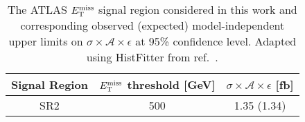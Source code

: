 \begin{table}[!htbp]
  \begin{center}
    \begin{tabular}{c|c|c}
      \hline
      \hline
      Signal Region & $E_{\mathrm{T}}^{\mathrm{miss}}$ threshold [GeV] & $\sigma \times \mathcal{A} \times \epsilon$ [fb] \\
      \hline
      SR2 & 500 & 1.35 (1.34) \\
      \hline
      \hline
    \end{tabular}
  \end{center}
  \caption{The ATLAS \monoWZ $E_{\mathrm{T}}^{\mathrm{miss}}$ signal region considered in this work and corresponding observed (expected) model-independent upper limits on $\sigma \times \mathcal{A} \times \epsilon$ at 95\% confidence level. Adapted using HistFitter from ref.~\cite{}.}
  \label{tab:sigmalim_monoWZ}
\end{table}
